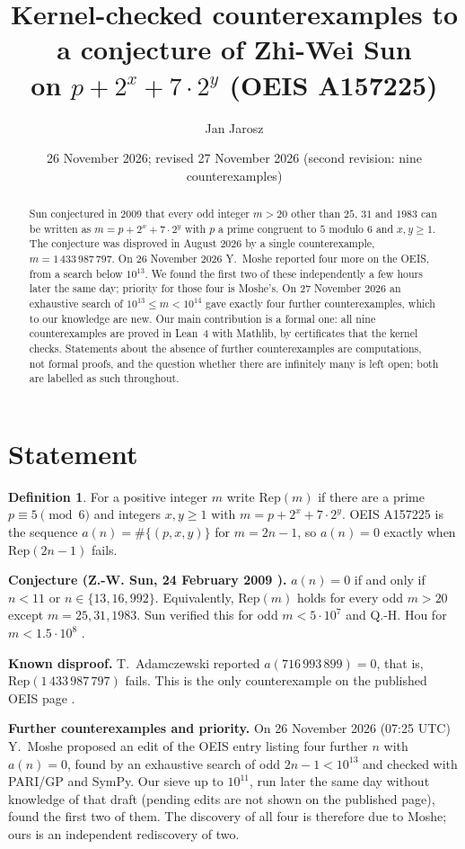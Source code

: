 \documentclass[11pt,a4paper]{article}
\title{Kernel-checked counterexamples to a conjecture of Zhi-Wei Sun\\ on $p+2^x+7\cdot 2^y$ (OEIS A157225)}
\author{Jan Jarosz}
\date{26 November 2026; revised 27 November 2026 (second revision: nine counterexamples)}
\theoremstyle{definition}\newtheorem{definition}[theorem]{Definition}
\theoremstyle{remark}\newtheorem{remark}[theorem]{Remark}
\newcommand{\Rep}{\mathrm{Rep}}
\begin{document}
\sloppy\maketitle
\begin{abstract}
Sun conjectured in 2009 that every odd integer $m>20$ other than $25$, $31$ and $1983$ can be written as
$m=p+2^x+7\cdot 2^y$ with $p$ a prime congruent to $5$ modulo $6$ and $x,y\ge 1$. The conjecture was disproved in
August 2026 by a single counterexample, $m=1\,433\,987\,797$. On 26 November 2026 Y.~Moshe reported four more on
the OEIS, from a search below $10^{13}$. We found the first two of these independently a few hours later the same
day; priority for those four is Moshe's. On 27 November 2026 an exhaustive search of $10^{13}\le m<10^{14}$ gave
exactly four further counterexamples, which to our knowledge are new. Our main contribution is a formal one: all
nine counterexamples are proved in Lean~4 with Mathlib, by certificates that the kernel checks. Statements about
the absence of further counterexamples are computations, not formal proofs, and the question whether there are
infinitely many is left open; both are labelled as such throughout.
\end{abstract}

\section{Statement}
\begin{definition}
For a positive integer $m$ write $\Rep(m)$ if there are a prime $p\equiv 5\pmod 6$ and integers $x,y\ge 1$ with
$m=p+2^x+7\cdot 2^y$. OEIS A157225 is the sequence $a(n)=\#\{(p,x,y)\}$ for $m=2n-1$, so $a(n)=0$ exactly when
$\Rep(2n-1)$ fails.
\end{definition}

\noindent\textbf{Conjecture (Z.-W. Sun, 24 February 2009 \cite{oeis,sun}).} $a(n)=0$ if and only if $n<11$ or
$n\in\{13,16,992\}$. Equivalently, $\Rep(m)$ holds for every odd $m>20$ except $m=25,31,1983$.
Sun verified this for odd $m<5\cdot 10^{7}$ and Q.-H. Hou for $m<1.5\cdot 10^{8}$ \cite{oeis}.

\medskip\noindent\textbf{Known disproof.} T.~Adamczewski \cite{epoch} reported $a(716\,993\,899)=0$, that is,
$\Rep(1\,433\,987\,797)$ fails. This is the only counterexample on the published OEIS page \cite{oeis}.

\medskip\noindent\textbf{Further counterexamples and priority.} On 26 November 2026 (07:25 UTC) Y.~Moshe proposed
an edit of the OEIS entry \cite{moshe} listing four further $n$ with $a(n)=0$, found by an exhaustive search of
odd $2n-1<10^{13}$ and checked with PARI/GP and SymPy. Our sieve up to $10^{11}$, run later the same day without
knowledge of that draft (pending edits are not shown on the published page), found the first two of them.
The discovery of all four is therefore due to Moshe; ours is an independent rediscovery of two.
\end{document}
